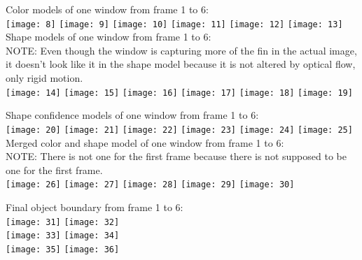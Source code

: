 \documentclass[10pt]{article}
\begin{document}
Color models of one window from frame 1 to 6: \\
\texttt{[image: 8]} 
\texttt{[image: 9]} 
\texttt{[image: 10]} 
\texttt{[image: 11]} 
\texttt{[image: 12]}
\texttt{[image: 13]} \\
Shape models of one window from frame 1 to 6: \\ 
NOTE: Even though the window is capturing more of the fin in the actual image, it doesn't look like it in the shape model because it is not altered by optical flow, only rigid motion. \\
\texttt{[image: 14]} 
\texttt{[image: 15]} 
\texttt{[image: 16]} 
\texttt{[image: 17]} 
\texttt{[image: 18]}
\texttt{[image: 19]} \\
\pagebreak

Shape confidence models of one window from frame 1 to 6: \\ 
\texttt{[image: 20]} 
\texttt{[image: 21]} 
\texttt{[image: 22]} 
\texttt{[image: 23]} 
\texttt{[image: 24]}
\texttt{[image: 25]} \\
Merged color and shape model of one window from frame 1 to 6: \\
NOTE: There is not one for the first frame because there is not supposed to be one for the first frame. \\
\texttt{[image: 26]} 
\texttt{[image: 27]} 
\texttt{[image: 28]} 
\texttt{[image: 29]}
\texttt{[image: 30]} \\
\pagebreak

Final object boundary from frame 1 to 6: \\ 
\texttt{[image: 31]} 
\texttt{[image: 32]} \\
\texttt{[image: 33]} 
\texttt{[image: 34]} \\
\texttt{[image: 35]}
\texttt{[image: 36]} \\
\pagebreak
\end{document}

